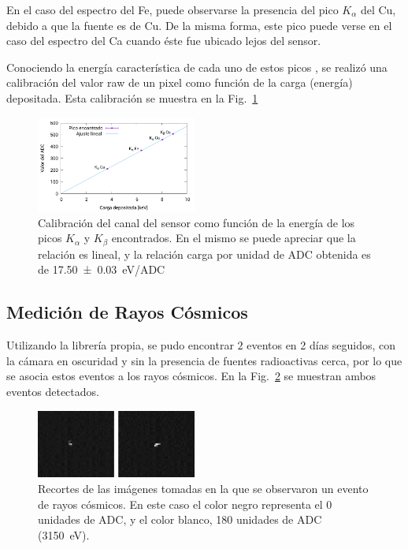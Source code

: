 \documentclass[twoside,twocolumn]{article}
\begin{document}
      En el caso del espectro del Fe, puede observarse la presencia del pico $K_\alpha$ del Cu, debido a que la fuente es de Cu.
      De la misma forma, este pico puede verse en el caso del espectro del Ca cuando éste fue ubicado lejos del sensor.

      Conociendo la energía característica de cada uno de estos picos \cite{xraybooklet},
      se realizó una calibración del valor raw de un pixel como función de la carga (energía) depositada.
      Esta calibración se muestra en la Fig.~\ref{fig:x-ray_calibration}

      \begin{figure}[h!]
        \includegraphics[width=0.47\textwidth]{figures/x-ray_calibration}
        \caption{Calibración del canal del sensor como función de la energía de
          los picos $K_{\alpha}$ y $K_{\beta}$ encontrados.
          En el mismo se puede apreciar que la relación es lineal,
          y la relación carga por unidad de ADC obtenida es de \SI{17.50(3)}{\eV / ADC}
        }
        \label{fig:x-ray_calibration}
      \end{figure}

    \subsection{Medición de Rayos Cósmicos}\label{sec:results:cosmic_ray}
      Utilizando la librería propia, se pudo encontrar $2$
      eventos en 2 días seguidos, con la cámara en oscuridad y sin la presencia de fuentes radioactivas cerca,
      por lo que se asocia estos eventos a los rayos cósmicos.
      En la Fig.~\ref{fig:cosmic_ray} se muestran ambos eventos detectados.

      \begin{figure}[h!]
        \centering
        \includegraphics[width=0.47\textwidth]{figures/doble_evento.png}
        \caption{Recortes de las imágenes tomadas en la que se observaron un evento de rayos cósmicos.
        En este caso el color negro representa el 0 unidades de ADC, y el color blanco, 180 unidades de ADC (\SI{3150}{\eV}).
        }
        \label{fig:cosmic_ray}
      \end{figure}
\end{document}
